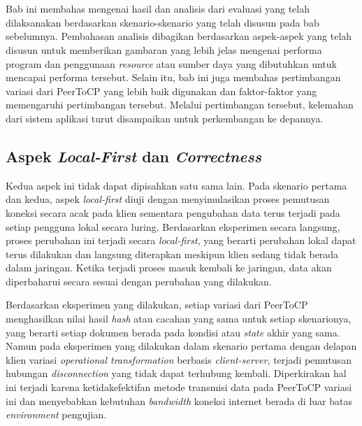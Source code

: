 \chapter{\babLima}
\label{bab:5}

Bab ini membahas mengenai hasil dan analisis dari evaluasi yang telah dilaksanakan berdasarkan skenario-skenario yang telah disusun pada bab sebelumnya. Pembahasan analisis dibagikan berdasarkan aspek-aspek yang telah disusun untuk memberikan gambaran yang lebih jelas mengenai performa program dan penggunaan \textit{resource} atau sumber daya yang dibutuhkan untuk mencapai performa tersebut. Selain itu, bab ini juga membahas pertimbangan variasi dari PeerToCP yang lebih baik digunakan dan faktor-faktor yang memengaruhi pertimbangan tersebut. Melalui pertimbangan tersebut, kelemahan dari sistem aplikasi turut disampaikan untuk perkembangan ke depannya.

\section{Aspek \textit{Local-First} dan \textit{Correctness}}

Kedua aspek ini tidak dapat dipisahkan satu sama lain. Pada skenario pertama dan kedua, aspek \textit{local-first} diuji dengan menyimulasikan proses pemutusan koneksi secara acak pada klien sementara pengubahan data terus terjadi pada setiap pengguna lokal secara luring. Berdasarkan eksperimen secara langsung, proses perubahan ini terjadi secara \textit{local-first}, yang berarti perubahan lokal dapat terus dilakukan dan langsung diterapkan meskipun klien sedang tidak berada dalam jaringan. Ketika terjadi proses masuk kembali ke jaringan, data akan diperbaharui secara sesuai dengan perubahan yang dilakukan.

Berdasarkan eksperimen yang dilakukan, setiap variasi dari PeerToCP menghasilkan nilai hasil \textit{hash} atau cacahan yang sama untuk setiap skenarionya, yang berarti setiap dokumen berada pada kondisi atau \textit{state} akhir yang sama. Namun pada eksperimen yang dilakukan dalam skenario pertama dengan delapan klien variasi \textit{operational transformation} berbasis \textit{client-server}, terjadi pemutusan hubungan \textit{disconnection} yang tidak dapat terhubung kembali. Diperkirakan hal ini terjadi karena ketidakefektifan metode transmisi data pada PeerToCP variasi ini dan menyebabkan kebutuhan \textit{bandwidth} koneksi internet berada di luar batas \textit{environment} pengujian.

